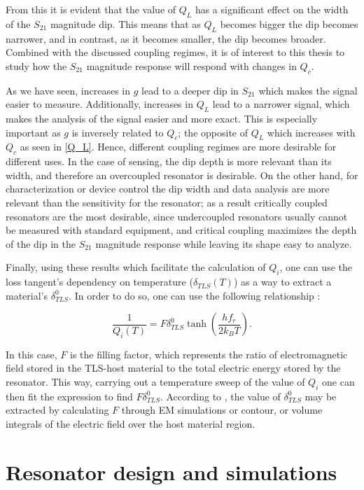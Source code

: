 \documentclass[12pt, a4paper]{article}
\begin{document}
From this it is evident that the value of $Q_L$ has a significant effect on the width of the $S_{21}$ magnitude dip. This means that as $Q_L$ becomes bigger the dip becomes narrower, and in contrast, as it becomes smaller, the dip becomes broader. Combined with the discussed coupling regimes, it is of interest to this thesis to study how the $S_{21}$ magnitude response will respond with changes in $Q_c$.

As we have seen, increases in $g$ lead to a deeper dip in $S_{21}$ which makes the signal easier to measure. Additionally, increases in $Q_L$ lead to a narrower signal, which makes the analysis of the signal easier and more exact. This is especially important as $g$ is inversely related to $Q_c$; the opposite of $Q_L$ which increases with $Q_c$ as seen in \cref{Q_L}. Hence, different coupling regimes are more desirable for different uses. In the case of sensing, the dip depth is more relevant than its width, and therefore an overcoupled resonator is desirable. On the other hand, for characterization or device control the dip width and data analysis are more relevant than the sensitivity for the resonator; as a result critically coupled resonators are the most desirable, since undercoupled resonators usually cannot be measured with standard equipment, and critical coupling maximizes the depth of the dip in the $S_{21}$ magnitude response while leaving its shape easy to analyze.

Finally, using these results which facilitate the calculation of $Q_i$, one can use the loss tangent's dependency on temperature ($\delta_{TLS}(T)$) as a way to extract a material's $\delta^0_{TLS}$. In order to do so, one can use the following relationship \cite{Gao2008}: 

\begin{equation}
    \label{Qi(T)}
    \frac{1}{Q_i(T)} = F \delta^0_{TLS} \tanh\left(\frac{h f_r}{2 k_B T}\right).
\end{equation}

In this case, $F$ is the filling factor, which represents the ratio of electromagnetic field stored in the TLS-host material to the total electric energy stored by the resonator. This way, carrying out a temperature sweep of the value of $Q_i$ one can then fit the expression to find $F \delta^0_{TLS}$. According to \cite{Gao2008}, the value of $\delta^0_{TLS}$ may be extracted by calculating $F$ through EM simulations or contour, or volume integrals of the electric field over the host material region.

\section{Resonator design and simulations}
\end{document}
